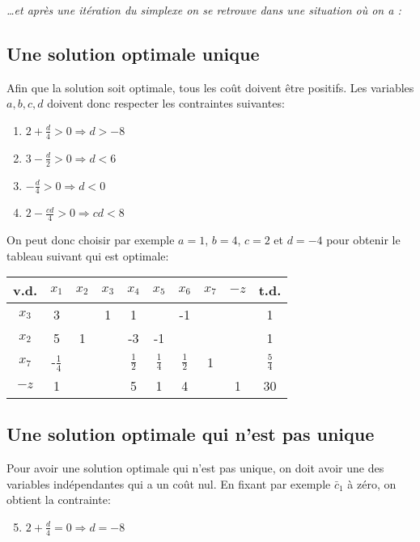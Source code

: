 \emph{\dots et après une itération du simplexe on se retrouve dans une situation où on a :}

\subsection{Une solution optimale unique}

Afin que la solution soit optimale, tous les coût doivent être positifs. Les variables $a,b,c,d$ doivent donc respecter les contraintes suivantes:
\begin{enumerate}[label=(\arabic*),itemsep=1pt]
	\item $2 + \frac{d}{4} > 0 \Rightarrow d > -8$
	\item $3 - \frac{d}{2} > 0 \Rightarrow d < 6$
	\item $ - \frac{d}{4} > 0 \Rightarrow d < 0$
	\item $2 - \frac{cd}{4} > 0 \Rightarrow cd < 8$
\end{enumerate}

On peut donc choisir par exemple $a = 1$, $b=4$, $c=2$ et $d=-4$ pour obtenir le tableau suivant qui est optimale:
	
\begin{center}
	\renewcommand{\arraystretch}{1.5}
	\begin{tabular}{|c|cccccccc|c|}
		\hline
		v.d.  &     $x_1$      & $x_2$ & $x_3$ &     $x_4$     &     $x_5$     &     $x_6$     & $x_7$ & $-z$ &     t.d.      \\ \hline
		$x_3$ &       3        &       &   1   &       1       &               &      -1       &       &      &       1       \\
		$x_2$ &       5        &   1   &       &      -3       &      -1       &               &       &      &       1       \\
		$x_7$ & -$\frac{1}{4}$ &       &       & $\frac{1}{2}$ & $\frac{1}{4}$ & $\frac{1}{2}$ &   1   &      & $\frac{5}{4}$ \\ \hline
		$-z$  &       1        &       &       &       5       &       1       &       4       &       &  1   &      30       \\ \hline
	\end{tabular}
\end{center}

\subsection{Une solution optimale qui n’est pas unique}
Pour avoir une solution optimale qui n’est pas unique, on doit avoir une des variables indépendantes qui a un coût nul. En fixant par exemple $\bar{c}_1$ à zéro, on obtient la contrainte:
\begin{enumerate}[label=(\arabic*),itemsep=1pt]
	\setcounter{enumi}{4}
	\item  $2 + \frac{d}{4} = 0 \Rightarrow d = -8$
\end{enumerate}

